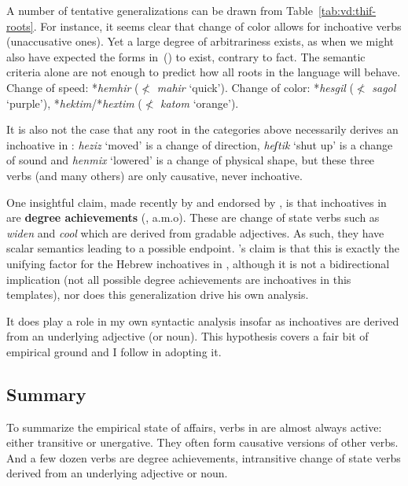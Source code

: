 

A number of tentative generalizations can be drawn from Table~\ref{tab:vd:thif-roots}. For instance, it seems clear that change of color allows for inchoative verbs (unaccusative ones). Yet a large degree of arbitrariness exists, as when we might also have expected the forms in~(\nextx) to exist, contrary to fact. The semantic criteria alone are not enough to predict how all roots in the language will behave.
\pex
	\a Change of speed:
		*\emph{hemhir} ($\nless$ \emph{mahir} `quick').
	\a Change of color:
		*\emph{hesgil} ($\nless$ \emph{sagol} `purple'), *\emph{hektim}/*\emph{hextim} ($\nless$ \emph{katom} `orange').
\xe

It is also not the case that any root in the categories above necessarily derives an inchoative in {\thif}: \emph{heziz} `moved' is a change of direction, \emph{heʃtik} `shut up' is a change of sound and \emph{henmix} `lowered' is a change of physical shape, but these three verbs (and many others) are only causative, never inchoative.

One insightful claim, made recently by \cite{lev16} and endorsed by \cite{kastner19tlr}, is that inchoatives in {\thif} are \textbf{degree achievements} (\citealt{dowty91,hayetal99,rotsteinwinter04,kennedylevin08,bobaljik12,mcnally17}, a.m.o). These are change of state verbs such as \emph{widen} and \emph{cool} which are derived from gradable adjectives. As such, they have scalar semantics leading to a possible endpoint. \citeauthor{lev16}'s claim is that this is exactly the unifying factor for the Hebrew inchoatives in {\thif}, although it is not a bidirectional implication (not all possible degree achievements are inchoatives in this templates), nor does this generalization drive his own analysis.

It does play a role in my own syntactic analysis insofar as inchoatives are derived from an underlying adjective (or noun). This hypothesis covers a fair bit of empirical ground and I follow \cite{lev16} in adopting it. 

	\subsection{Summary}
To summarize the empirical state of affairs, verbs in {\thif} are almost always active: either transitive or unergative. They often form causative versions of other verbs. And a few dozen verbs are degree achievements, intransitive change of state verbs derived from an underlying adjective or noun.

